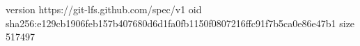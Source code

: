 version https://git-lfs.github.com/spec/v1
oid sha256:e129cb1906feb157b407680d6d1fa0fb1150f0807216ffc91f7b5ca0e86e47b1
size 517497
